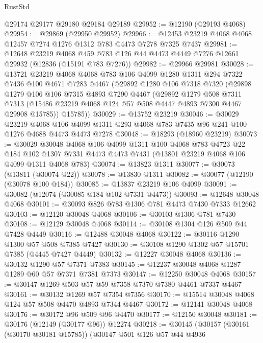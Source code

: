 \begin{lexlean}{RustStd}
\begin{coremodule}
    @29174
    @29177
    @29180
    @29184
    @29189
@29952 := @12190 (@29193 @4068)
@29954 := @29869 (@29950 @29952)
@29966 := @12453 @23219 @4068 @4068 @12457 @7274 @1276 @1312 @783 @4473 @7278 @7325 @7437
@29981 := @12648
    @23219
    @4068
    @459
    @783
    @126
    @44
    @4473
    @4449
    @7276
    @12661
    @29932
    (@12836 (@15191 @783 @7276))
@29982 := @29966 @29981
@30028 := @13721
    @23219
    @4068
    @4068
    @783
    @106
    @4099
    @1280
    @1311
    @294
    @7322
    @7436
    @100
    @4671
    @7283
    @4467
    (@29892
      @1280
      @106
      @7318
      @7320
      (@29898
        @1279
        @106
        @106
        @7315
        @4893
        @7290
        @4467
        (@29892
          @1279
          @508
          @7311
          @7313
          (@15486 @23219 @4068 @124 @57 @508 @4447 @4893 @7300 @4467 @29908 @15785))
        @15785))
@30029 := @13752 @23219
@30046 := @30029
    @23219
    @4068
    @106
    @4099
    @1311
    @293
    @4068
    @783
    @7435
    @96
    @241
    @100
    @1276
    @4688
    @4473
    @4473
    @7278
@30048 := @18293 (@18960 @23219)
@30073 := @30029
    @30048
    @4068
    @106
    @4099
    @1311
    @100
    @4068
    @783
    @4723
    @22
    @184
    @102
    @1307
    @7331
    @4473
    @4473
    @7431
    (@13801 @23219 @4068 @106 @4099 @1311 @4068 @783)
@30074 := @13823 @1311
@30077 := @30073 (@13811 (@30074 @22))
@30078 := @13830 @1311
@30082 := @30077 (@12190 (@30078 @100 @184))
@30085 := @13837 @23219 @106 @4099
@30091 := @30082 (@12074 (@30085 @184 @102 @7331 @4473))
@30093 := @12648 @30048 @4068
@30101 := @30093 @826 @783 @1306 @781 @4473 @7430 @7333 @12662
@30103 := @12120 @30048 @4068
@30106 := @30103 @1306 @781 @7430
@30108 := @12129 @30048 @4068
@30114 := @30108 @1304 @126 @509 @44 @7428 @4449
@30116 := @12488 @30048 @4068
@30122 := @30116 @1290 @1300 @57 @508 @7385 @7427
@30130 := @30108 @1290 @1302 @57 @15701 @7385 (@4445 @7427 @4449)
@30132 := @12227 @30048 @4068
@30136 := @30132 @1290 @57 @7371 @7383
@30145 := @12237 @30048 @4068 @1287 @1289 @60 @57 @7371 @7381 @7373
@30147 := @12250 @30048 @4068
@30157 := @30147 @1269 @503 @57 @59 @7358 @7370 @7380 @4461 @7337 @4467
@30161 := @30132 @1269 @57 @7354 @7356
@30170 := @15514 @30048 @4068 @124 @57 @508 @4470 @4893 @7344 @4467
@30172 := @12141 @30048 @4068
@30176 := @30172 @96 @509 @96 @4470
@30177 := @12150 @30048
@30181 := @30176 (@12149 (@30177 @96)) @12274
@30218 := @30145
    (@30157
      (@30161 (@30170 @30181 @15785))
      (@30147
        @501
        @126
        @57
        @44
        @4936

\end{coremodule}
\end{lexlean}
